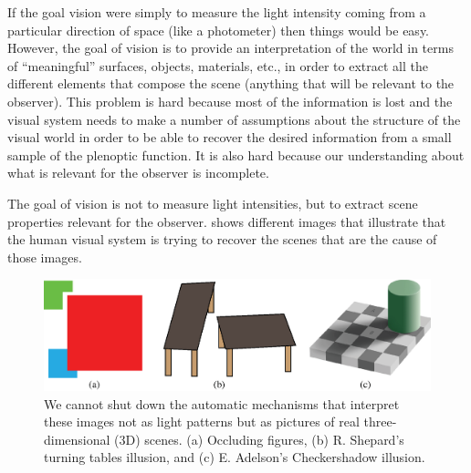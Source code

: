 If the goal vision were  simply to measure the light intensity coming from a particular direction of space (like a photometer) then things would be easy. However, the goal of vision is to provide an interpretation of the world in terms of ``meaningful'' surfaces, objects, materials, etc., in order to extract all the different elements that compose the scene (anything that will be relevant to the observer). This problem is hard because most of the information is lost and the visual system needs to make a number of assumptions about the structure of the visual world in order to be able to recover the desired information from a small sample of the plenoptic function. It is also hard because our understanding about what is relevant for the observer is incomplete.

The goal of vision is not to measure light intensities, but to extract scene properties relevant for the observer. \Fig{\ref{fig:measuringScene}} shows different images that illustrate that the human visual system is trying to recover the scenes that are the cause of those images.


\begin{figure}[t]
    \centerline{
        \includegraphics[width=1\linewidth]{figures/taxonomy/measuringScene2.eps}
    }
    \caption{We cannot shut down the automatic mechanisms that interpret these images not as light patterns but as pictures of real three-dimensional (3D) scenes. (a) Occluding figures, (b) R. Shepard's turning tables illusion, and (c) E. Adelson's Checkershadow illusion.
    }
    \label{fig:measuringScene}
\end{figure}

